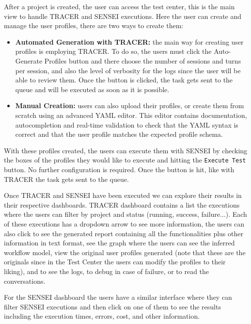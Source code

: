After a project is created,
the user can access the test center,
this is the main view to handle \ac{TRACER} and SENSEI executions.
Here the user can create and manage the user profiles,
there are two ways to create them:
\begin{itemize}
  \item \textbf{Automated Generation with \ac{TRACER}:}
    the main way for creating user profiles is employing \ac{TRACER}.
    To do so, the users must click the Auto-Generate Profiles button
    and there choose the number of sessions and turns per session,
    and also the level of verbosity for the logs
    since the user will be able to review them.
    Once the button is clicked, the task gets sent to the queue
    and will be executed as soon as it is possible.
  \item \textbf{Manual Creation:}
    users can also upload their profiles,
    or create them from scratch using an advanced YAML editor.
    This editor contains documentation, autocompletion
    and real-time validation to check that the YAML syntax is correct
    and that the user profile matches the expected profile schema.
\end{itemize}

With these profiles created,
the users can execute them with SENSEI
by checking the boxes of the profiles they would like to execute
and hitting the \texttt{Execute Test} button.
No further configuration is required.
Once the button is hit, like with \ac{TRACER}
the task gets sent to the queue.

Once \ac{TRACER} and SENSEI have been executed
we can explore their results in their respective dashboards.
\ac{TRACER} dashboard contains a list the executions
where the users can filter by project and status (running, success, failure...).
Each of these executions has a dropdown arrow to see more information,
the users can also click to see the generated report
containing all the functionalities plus other information in text format,
see the graph where the users can see the inferred workflow model,
view the original user profiles generated
(note that these are the originals since in the Test Center
the users can modify the profiles to their liking),
and to see the logs, to debug in case of failure, or to read the conversations.

For the SENSEI dashboard the users have a similar interface
where they can filter SENSEI executions
and then click on one of them to see the results
including the execution times,
errors, cost, and other information.

